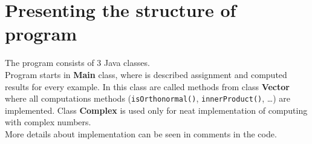 \documentclass[11pt,letterpaper,oneside]{article}
\begin{document}
\maketitle


\section{Presenting the structure of program}
The program consists of 3 Java classes.\\
Program starts in {\bf Main} class, where is described assignment
and computed results for every example. In this class are called methods from
class {\bf Vector} where all computations methods (\verb|isOrthonormal()|,
\verb|innerProduct()|, \ldots) are implemented. Class {\bf Complex} is used
only for neat implementation of computing with complex numbers.\\ 
More details about implementation can be seen in comments in the code.
\end{document}
